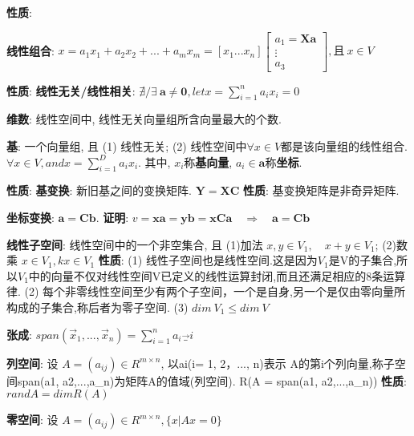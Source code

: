 \documentclass{article}
\begin{document}
            \textbf{性质}:


        \textbf{线性组合}: $x = a_1 x_1 +a_2 x_2+ ... +a_m x_m = [x_1 ... x_n] \begin{bmatrix} a_1 = \boldsymbol X \boldsymbol a\\ \vdots \\ a_3 \end{bmatrix}, \text{且}\ x \in V$

            \textbf{性质}: 
                \textbf{线性无关/线性相关}: $\nexists / \exists\ \boldsymbol a \neq \boldsymbol 0, let x = \sum\limits_{i=1}^n a_i x_i = 0$ 

        \textbf{维数}: 线性空间中, 线性无关向量组所含向量最大的个数.
        
        \textbf{基}: 一个向量组, 且 (1) 线性无关; (2) 线性空间中$\forall x \in V$都是该向量组的线性组合. $\forall x \in V, and x = \sum\limits_{i=1}^{D} a_i x_i$. 其中, $x_i$称\textbf{基向量}, $a_i \in \boldsymbol a$称\textbf{坐标}.

            \textbf{性质}: 
                \textbf{基变换}: 新旧基之间的变换矩阵. $\boldsymbol Y = \boldsymbol X \boldsymbol C$
                    \textbf{性质}: 基变换矩阵是非奇异矩阵.

                \textbf{坐标变换}: $\boldsymbol a = \boldsymbol C \boldsymbol b$.
                    \textbf{证明}: $v = \boldsymbol x \boldsymbol a = \boldsymbol y \boldsymbol b = \boldsymbol x \boldsymbol C \boldsymbol a \quad \Rightarrow \quad \boldsymbol a = \boldsymbol C \boldsymbol b$

            
        \textbf{线性子空间}: 线性空间中的一个非空集合, 且 (1)加法 $x,y\in V_1 ,\quad x+y \in V_1$; (2)数乘 $x \in V_1, k x \in V_1$
            \textbf{性质}: 
                (1) 线性子空间也是线性空间.这是因为$V_1$是V的子集合,所以$V_1$中的向量不仅对线性空间V已定义的线性运算封闭,而且还满足相应的8条运算律.
                (2) 每个非零线性空间至少有两个子空间，一个是自身,另一个是仅由零向量所构成的子集合,称后者为零子空间.             
                (3) $dim\ V_1 \le dim\ V$

        \textbf{张成}: $span(\vec x_1,...,\vec x_n ) = {\sum_{i=1}^n a_i \vec_i}$ 
            
        \textbf{列空间}: 设 $A = (a_{ij})\in R^{m×n}$, 以ai(i= 1, 2，..., n)表示
        A的第i个列向量,称子空间span(a1, a2,...,a_n)为矩阵A的值域(列空间). R(A = span(a1, a2,...,a_n))
            \textbf{性质}: $rand A = dim R(A)$

        \textbf{零空间}: 设 $A = (a_{ij})\in R^{m×n}, \{x | Ax = 0\}$
        
\end{document}
